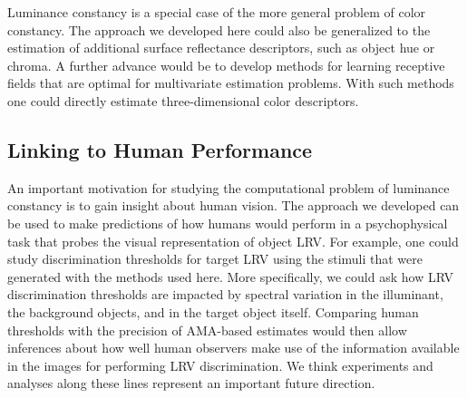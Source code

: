 \documentclass{jov}
\begin{document}
Luminance constancy is a special case of the more general problem of color constancy.
The approach we developed here could also be generalized to the estimation of additional surface reflectance descriptors, such as object hue or chroma.
A further advance would be to develop methods for learning receptive fields that are optimal for multivariate estimation problems. 
With such methods one could directly estimate three-dimensional color descriptors.

\subsection{Linking to Human Performance}

An important motivation for studying the computational problem of luminance constancy is to gain insight about human vision.
The approach we developed can be used to make predictions of how humans would perform in a psychophysical task that probes the visual representation of object LRV.
For example, one could study discrimination thresholds for target LRV using the stimuli that were generated with the methods used here.
More specifically, we could ask how LRV discrimination thresholds are impacted by spectral variation in the illuminant, the background objects, and in the target object itself.
Comparing human thresholds with the precision of AMA-based estimates would then allow inferences about how well human observers make use of the information available in the images for performing LRV discrimination.
We think experiments and analyses along these lines represent an important future direction.



\end{document}
